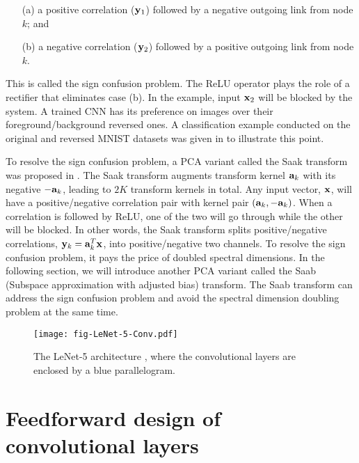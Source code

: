 \documentclass[preprint,12pt]{elsarticle}
\begin{document}
\begin{itemize}
\setlength{\itemsep}{-2pt}
\item[(a)] a positive correlation (${\bf y}_1$) followed by a negative
outgoing link from node $k$; and
\item[(b)] a negative correlation (${\bf y}_2$) followed by a positive
outgoing link from node $k$. 
\end{itemize}
This is called the sign confusion problem.  The ReLU operator plays the
role of a rectifier that eliminates case (b). In the example, input
${\bf x}_2$ will be blocked by the system. A trained CNN has its
preference on images over their foreground/background reversed ones.  A
classification example conducted on the original and reversed MNIST
datasets was given in \cite{kuo2016understanding} to illustrate this
point. 

To resolve the sign confusion problem, a PCA variant called the Saak
transform was proposed in \cite{kuo2018data}. The Saak transform
augments transform kernel ${\bf a}_k$ with its negative $-{\bf a}_k$,
leading to $2K$ transform kernels in total. Any input vector, ${\bf x}$,
will have a positive/negative correlation pair with kernel pair $({\bf
a}_k,-{\bf a}_k)$. When a correlation is followed by ReLU, one of the
two will go through while the other will be blocked. In other words, the
Saak transform splits positive/negative correlations, ${\bf y}_k={\bf
a}_k^T {\bf x}$, into positive/negative two channels.  To resolve the
sign confusion problem, it pays the price of doubled spectral
dimensions. In the following section, we will introduce another PCA
variant called the Saab (Subspace approximation with adjusted bias)
transform. The Saab transform can address the sign confusion problem and
avoid the spectral dimension doubling problem at the same time. 

\begin{figure}[htb]
\centering
\texttt{[image: fig-LeNet-5-Conv.pdf]}
\caption{The LeNet-5 architecture \cite{LeNet1998}, where the
convolutional layers are enclosed by a blue parallelogram.}
\label{fig:LeNet-5-Conv}
\end{figure}

\section{Feedforward design of convolutional layers}\label{sec:Saab}
\end{document}
